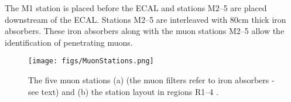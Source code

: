 The M1 station is placed before the \Gls{ECAL} and stations M2--5 are placed downstream of the ECAL. Stations M2--5 are interleaved with 80cm thick iron absorbers. These iron absorbers along with the muon stations M2--5 allow the identification of penetrating muons.

\begin{figure}[h!]
  \centering
  \texttt{[image: figs/MuonStations.png]} 
  \caption{The five muon stations (a) (the muon filters refer to iron absorbers - see text) and (b) the station layout in regions R1--4 \cite{muon}.
  }
  \label{fig:muonst}
\end{figure}






